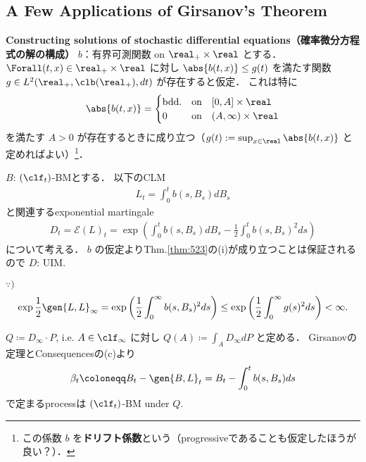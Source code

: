 \documentclass{jsarticle}
\begin{document}
\subsection{A Few Applications of Girsanov's Theorem}

\textbf{Constructing solutions of stochastic differential equations（確率微分方程式の解の構成）}
$b$：有界可測関数 on $\real_+\times\real$ とする．
$\Forall (t,x)\in\real_+\times\real$ に対し $\abs{b(t,x)}\le g(t)$ を満たす関数 $g\in L^2(\real_+,\clb(\real_+),dt)$ が存在すると仮定．
これは特に
\begin{align}
    \abs{b(t,x)}=
    \begin{cases}
        \text{bdd.} &\text{on}\quad [0,A]\times\real \\
        0 &\text{on}\quad (A,\infty)\times\real
    \end{cases}
\end{align}
を満たす $A>0$ が存在するときに成り立つ（$g(t):=\sup_{x\in\real}\abs{b(t,x)}$ と定めればよい）\footnote{この係数 $b$ を\textbf{ドリフト係数}という（progressiveであることも仮定したほうが良い？）．}．

$B$: $(\clf_t)$-BMとする．
以下のCLM
\begin{align}
    L_t=\int_0^t b(s,B_s)dB_s
\end{align}
と関連するexponential martingale
\begin{align}
    D_t
    = \mathcal{E}(L)_t
    = \exp\left(\int_0^t b(s,B_s)dB_s-\frac{1}{2}\int_0^t b(s,B_s)^2 ds\right)
\end{align}
について考える．
$b$ の仮定よりThm.\ref{thm:523}の(i)が成り立つことは保証されるので $D$: UIM.

\begin{screen}
    $\because)$
    \begin{align}
        \exp\frac{1}{2}\gen{L,L}_\infty
        = \exp\left(\frac{1}{2}\int_0^\infty b(s,B_s)^2 ds\right)
        \le \exp\left(\frac{1}{2}\int_0^\infty g(s)^2 ds\right)
        < \infty.
    \end{align}
\end{screen}

$Q\coloneqq D_\infty\cdot P$, i.e. $A\in\clf_\infty$ に対し $Q(A)\coloneqq\int_A D_\infty dP$ と定める．
Girsanovの定理とConsequencesの(c)より
\begin{align}
    \beta_t
    \coloneqq B_t-\gen{B,L}_t
    = B_t-\int_0^t b(s,B_s)ds
\end{align}
で定まるprocessは $(\clf_t)$-BM under $Q.$
\end{document}

